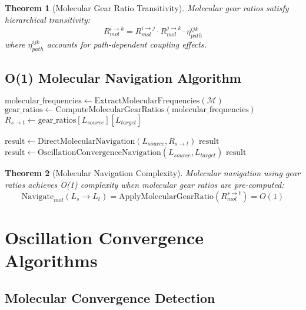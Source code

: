 \documentclass[12pt,a4paper]{article}
\newtheorem{theorem}{Theorem}[section]
\begin{document}
\begin{theorem}[Molecular Gear Ratio Transitivity]
Molecular gear ratios satisfy hierarchical transitivity:
\begin{equation}
R_{mol}^{i \to k} = R_{mol}^{i \to j} \cdot R_{mol}^{j \to k} \cdot \eta_{path}^{ijk}
\end{equation}
where $\eta_{path}^{ijk}$ accounts for path-dependent coupling effects.
\end{theorem}

\subsection{O(1) Molecular Navigation Algorithm}

\begin{algorithm}
\caption{Hierarchical Molecular Navigation}
\begin{algorithmic}[1]
    \State $\text{molecular\_frequencies} \gets \text{ExtractMolecularFrequencies}(\mathcal{M})$
    \State $\text{gear\_ratios} \gets \text{ComputeMolecularGearRatios}(\text{molecular\_frequencies})$
    \State $R_{s \to t} \gets \text{gear\_ratios}[L_{source}][L_{target}]$

        \State $\text{result} \gets \text{DirectMolecularNavigation}(L_{source}, R_{s \to t})$
        \State \Return $\text{result}$
    \Else
        \State $\text{result} \gets \text{OscillationConvergenceNavigation}(L_{source}, L_{target})$
        \State \Return $\text{result}$
    \EndIf
\EndProcedure
\end{algorithmic}
\end{algorithm}

\begin{theorem}[Molecular Navigation Complexity]
Molecular navigation using gear ratios achieves O(1) complexity when molecular gear ratios are pre-computed:
\begin{equation}
\text{Navigate}_{mol}(L_s \to L_t) = \text{ApplyMolecularGearRatio}(R_{mol}^{s \to t}) = O(1)
\end{equation}
\end{theorem}

\section{Oscillation Convergence Algorithms}

\subsection{Molecular Convergence Detection}
\end{document}
